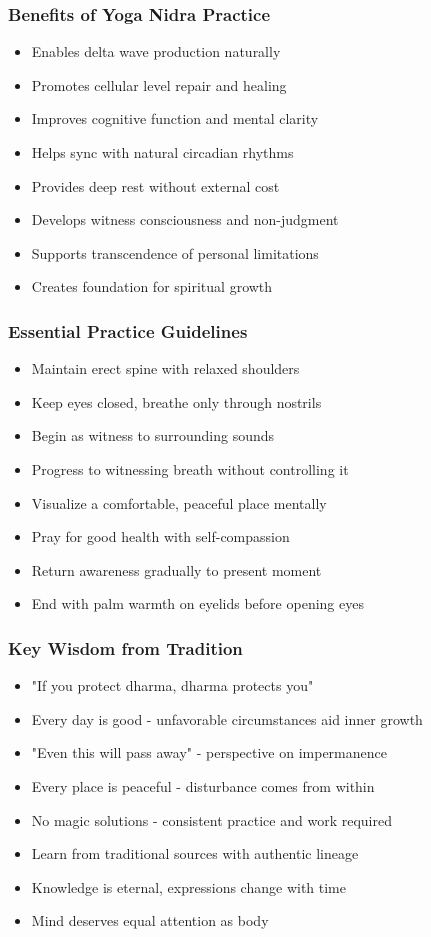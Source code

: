 \begin{frame}[fragile]\frametitle{Benefits of Yoga Nidra Practice}
      \begin{itemize}
	\item Enables delta wave production naturally
	\item Promotes cellular level repair and healing
	\item Improves cognitive function and mental clarity
	\item Helps sync with natural circadian rhythms
	\item Provides deep rest without external cost
	\item Develops witness consciousness and non-judgment
	\item Supports transcendence of personal limitations
	\item Creates foundation for spiritual growth
	  \end{itemize}
\end{frame}

\begin{frame}[fragile]\frametitle{Essential Practice Guidelines}
      \begin{itemize}
	\item Maintain erect spine with relaxed shoulders
	\item Keep eyes closed, breathe only through nostrils
	\item Begin as witness to surrounding sounds
	\item Progress to witnessing breath without controlling it
	\item Visualize a comfortable, peaceful place mentally
	\item Pray for good health with self-compassion
	\item Return awareness gradually to present moment
	\item End with palm warmth on eyelids before opening eyes
	  \end{itemize}
\end{frame}

\begin{frame}[fragile]\frametitle{Key Wisdom from Tradition}
      \begin{itemize}
	\item "If you protect dharma, dharma protects you"
	\item Every day is good - unfavorable circumstances aid inner growth
	\item "Even this will pass away" - perspective on impermanence
	\item Every place is peaceful - disturbance comes from within
	\item No magic solutions - consistent practice and work required
	\item Learn from traditional sources with authentic lineage
	\item Knowledge is eternal, expressions change with time
	\item Mind deserves equal attention as body
	  \end{itemize}
\end{frame}